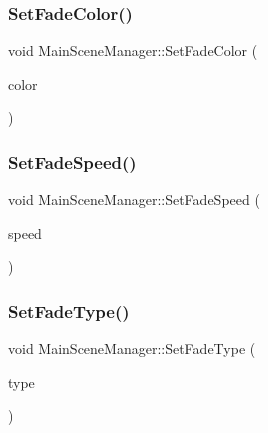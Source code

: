 \subsubsection{\texorpdfstring{Set\+Fade\+Color()}{SetFadeColor()}}
{\footnotesize\ttfamily void Main\+Scene\+Manager\+::\+Set\+Fade\+Color (\begin{DoxyParamCaption}\item[{\mbox{\hyperlink{_vector3_d_8h_a680c30c4a07d86fe763c7e01169cd6cc}{X\+Color4}}}]{color }\end{DoxyParamCaption})\hspace{0.3cm}{\ttfamily [inline]}}

\mbox{\label{class_main_scene_manager_acc3cb332f6d2ab7606a3a02aaf1a31a5}} 
\subsubsection{\texorpdfstring{Set\+Fade\+Speed()}{SetFadeSpeed()}}
{\footnotesize\ttfamily void Main\+Scene\+Manager\+::\+Set\+Fade\+Speed (\begin{DoxyParamCaption}\item[{float}]{speed }\end{DoxyParamCaption})\hspace{0.3cm}{\ttfamily [inline]}}

\mbox{\label{class_main_scene_manager_a0bc7484976a4ccd3a316dbcb8f65f133}} 
\subsubsection{\texorpdfstring{Set\+Fade\+Type()}{SetFadeType()}}
{\footnotesize\ttfamily void Main\+Scene\+Manager\+::\+Set\+Fade\+Type (\begin{DoxyParamCaption}\item[{\mbox{\hyperlink{class_fade_ac06f27215b454aa05b93c236476d6e80}{Fade\+::\+Type}}}]{type }\end{DoxyParamCaption})\hspace{0.3cm}{\ttfamily [inline]}}

